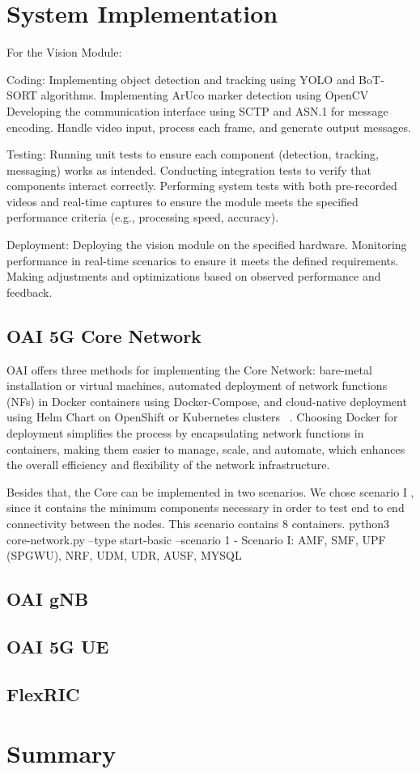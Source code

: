 \section{System Implementation}\label{sec:impl}

For the Vision Module:

    Coding:
        Implementing object detection and tracking using YOLO and BoT-SORT algorithms.
        Implementing ArUco marker detection using OpenCV
        Developing the communication interface using SCTP and ASN.1 for message encoding.
        Handle video input, process each frame, and generate output messages.

    Testing:
        Running unit tests to ensure each component (detection, tracking, messaging) works as intended.
        Conducting integration tests to verify that components interact correctly.
        Performing system tests with both pre-recorded videos and real-time captures to ensure the module meets the specified performance criteria (e.g., processing speed, accuracy).

    Deployment:
        Deploying the vision module on the specified hardware.
        Monitoring performance in real-time scenarios to ensure it meets the defined requirements.
        Making adjustments and optimizations based on observed performance and feedback.

\subsection{OAI 5G Core Network}
OAI offers three methods for implementing the Core Network: bare-metal installation or virtual machines, automated deployment of network functions (NFs) in Docker containers using Docker-Compose, and cloud-native deployment using Helm Chart on OpenShift or Kubernetes clusters ~\cite{}.
Choosing Docker for deployment simplifies the process by encapsulating network functions in containers, making them easier to manage, scale, and automate, which enhances the overall efficiency and flexibility of the network infrastructure.

Besides that, the Core can be implemented in two scenarios.
We chose scenario I , since it contains the minimum components necessary in order to test end to end connectivity between the nodes.
This scenario contains 8 containers.
python3 core-network.py --type start-basic --scenario 1
- Scenario I:  AMF, SMF, UPF (SPGWU), NRF, UDM, UDR, AUSF, MYSQL


\subsection{OAI gNB}
\subsection{OAI 5G UE}
\subsection{FlexRIC}


\section{Summary}






